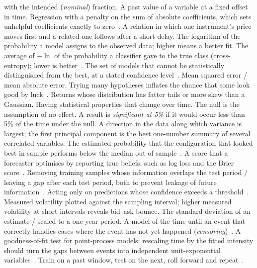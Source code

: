 \begin{description}[leftmargin=1.2em,style=sameline,itemsep=1pt,font=\normalfont\bfseries]
  with the intended (\emph{nominal}) fraction.
 A past value of a variable at a fixed offset in time.
 Regression with a penalty on the sum of absolute coefficients, which sets unhelpful coefficients exactly to zero~\citep{tibshirani1996}.
 A relation in which one instrument's price moves first and a related one follows after a short delay.
 The logarithm of the probability a model assigns to the observed data; higher
  means a better fit.
 The average of $-\ln$ of the probability a classifier gave to the true class
  (cross-entropy); lower is better~\citep{hastie2009}.
 The set of models that cannot be statistically distinguished from the best, at a stated confidence level~\citep{hansen2011mcs}.
 Mean squared error / mean absolute error.
 Trying many hypotheses inflates the chance that some look good by
  luck~\citep{white2000,harvey2016}.
 Returns whose distribution has fatter tails or more skew than a Gaussian.
 Having statistical properties that change over time.
 The null is the assumption of no effect. A result is
  \emph{significant at 5\%} if it would occur less than 5\% of the time under the null.
 A direction in the data along which variance is largest; the first principal component is the best one-number summary of several correlated variables.
 The estimated probability that the configuration that
  looked best in sample performs below the median out of sample~\citep{bailey2014pbo}.
 A score that a forecaster optimises by reporting true beliefs, such as log loss and the Brier score~\citep{gneiting2007}.
 Removing training samples whose information overlaps the test period / leaving
  a gap after each test period, both to prevent leakage of future
  information~\citep{lopezdeprado2018}.
 Acting only on predictions whose confidence exceeds a
  threshold~\citep{geifman2017}.
 Measured volatility plotted against the sampling interval; higher measured volatility at short intervals reveals bid--ask bounce.
 The standard deviation of an estimate / scaled to a one-year
  period.
 A model of the time until an event that correctly handles cases where the event
  has not yet happened (\emph{censoring})~\citep{cox1972}.
 A goodness-of-fit test for point-process models: rescaling time by the
  fitted intensity should turn the gaps between events into independent unit-exponential
  variables~\citep{brown2002}.
 Train on a past window, test on the next, roll forward and
  repeat~\citep{lopezdeprado2018}.
\end{description}

